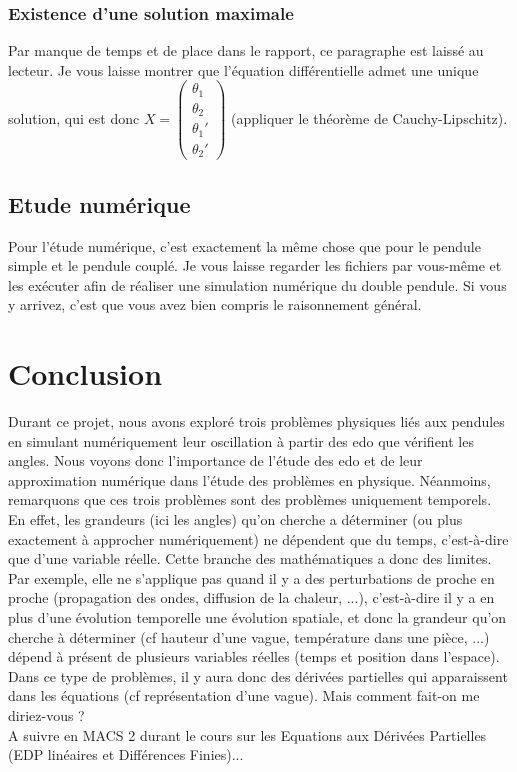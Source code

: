 \documentclass[9pt,a4paper]{article}
\begin{document}
\subsubsection{Existence d'une solution maximale}
Par manque de temps et de place dans le rapport, ce paragraphe est laissé au lecteur. Je vous laisse montrer que l'équation différentielle admet une unique solution, qui est donc $X = \begin{pmatrix}
    \theta_1 \\
    \theta_2 \\
    \theta_1' \\
    \theta_2'
\end{pmatrix}$ (appliquer le théorème de Cauchy-Lipschitz).
\subsection{Etude numérique}
Pour l'étude numérique, c'est exactement la même chose que pour le pendule simple et le pendule couplé. Je vous laisse regarder les fichiers par vous-même et les exécuter afin de réaliser une simulation numérique du double pendule. Si vous y arrivez, c'est que vous avez bien compris le raisonnement général.
\section{Conclusion}
Durant ce projet, nous avons exploré trois problèmes physiques liés aux pendules en simulant numériquement leur oscillation à partir des \gls{edo} que vérifient les angles. Nous voyons donc l'importance de l'étude des \gls{edo} et de leur approximation numérique dans l'étude des problèmes en physique. Néanmoins, remarquons que ces trois problèmes sont des problèmes uniquement temporels. En effet, les grandeurs (ici les angles) qu'on cherche a déterminer (ou plus exactement à approcher numériquement) ne dépendent que du temps, c'est-à-dire que d'une variable réelle. Cette branche des mathématiques a donc des limites. Par exemple, elle ne s'applique pas quand il y a des perturbations de proche en proche (propagation des ondes, diffusion de la chaleur, ...), c'est-à-dire il y a en plus d'une évolution temporelle une évolution spatiale, et donc la grandeur qu'on cherche à déterminer (cf hauteur d'une vague, température dans une pièce, ...) dépend à présent de plusieurs variables réelles (temps et position dans l'espace). Dans ce type de problèmes, il y aura donc des dérivées partielles qui apparaissent dans les équations (cf représentation d'une vague). Mais comment fait-on me diriez-vous ?\\
A suivre en MACS 2 durant le cours sur les Equations aux Dérivées Partielles (EDP linéaires et Différences Finies)...\\
\end{document}
